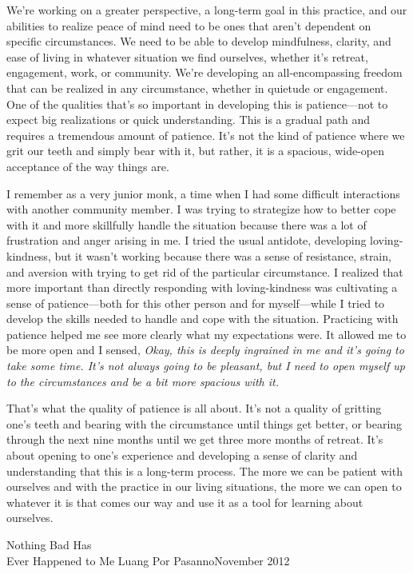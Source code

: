 We're working on a greater perspective, a long-term goal in this 
practice, and our abilities to realize peace of mind need to be ones 
that aren't dependent on specific circumstances. We need to be able to 
develop mindfulness, clarity, and ease of living in whatever situation 
we find ourselves, whether it's retreat, engagement, work, or 
community. We're developing an all-encompassing freedom that can be 
realized in any circumstance, whether in quietude or engagement. One of 
the qualities that's so important in developing this is patience---not 
to expect big realizations or quick understanding. This is a gradual 
path and requires a tremendous amount of patience. It's not the kind of 
patience where we grit our teeth and simply bear with it, but rather, 
it is a spacious, wide-open acceptance of the way things are.

I remember as a very junior monk, a time when I had some difficult 
interactions with another community member. I was trying to strategize 
how to better cope with it and more skillfully handle the situation 
because there was a lot of frustration and anger arising in me. I tried 
the usual antidote, developing loving-kindness, but it wasn't working 
because there was a sense of resistance, strain, and aversion with 
trying to get rid of the particular circumstance. I realized that more 
important than directly responding with loving-kindness was cultivating 
a sense of patience---both for this other person and for myself---while 
I tried to develop the skills needed to handle and cope with the 
situation. Practicing with patience helped me see more clearly what my 
expectations were. It allowed me to be more open and I sensed, 
\emph{Okay, this is deeply ingrained in me and it's going to take some 
time. It's not always going to be pleasant, but I need to open myself 
up to the circumstances and be a bit more spacious with it.}

That's what the quality of patience is all about. It's not a quality of 
gritting one's teeth and bearing with the circumstance until things get 
better, or bearing through the next nine months until we get three more 
months of retreat. It's about opening to one's experience and 
developing a sense of clarity and understanding that this is a 
long-term process. The more we can be patient with ourselves and with 
the practice in our living situations, the more we can open to whatever 
it is that comes our way and use it as a tool for learning about 
ourselves.

{Nothing Bad Has\\Ever Happened to Me}
{Luang Por Pasanno}{November 2012}

